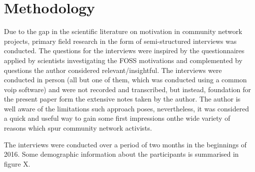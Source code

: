 \section{Methodology}

Due to the gap in the scientific literature on motivation in community network projects, primary field research in the form of semi-structured interviews was conducted.
The questions for the interviews were inspired by the questionnaires applied by scientists investigating the FOSS motivations\cite{HarOu2002}\cite{LakWo2005} and complemented by questions the author considered relevant/insightful. %
The interviews were conducted in person (all but one of them, which was conducted using a common voip software) and were not recorded and transcribed, but instead, foundation for the present paper form the extensive notes taken by the author. %
The author is well aware of the limitations such approach poses, nevertheless, it was considered a quick and useful way to gain some first impressions onthe wide variety of reasons which spur community network activists.

The interviews were conducted over a period of two months in the beginnings of 2016.
Some demographic information about the participants is summarised in figure X.


\begin{comment}
\begin{itemize}
  \item literature review for FOSS <-- only as comparison
  \item semi-structured interviews for Freifunk <-- focus
    \begin{itemize}
      \item limitations of the methodology
    \end{itemize}
\end{itemize}
\end{comment}
